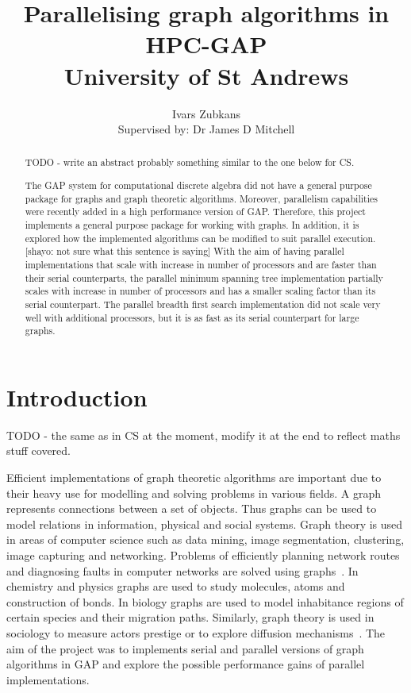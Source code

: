 \documentclass{report}
\title{Parallelising graph algorithms in HPC-GAP \\ \vspace{2 mm} {\large University of St Andrews}}
\author{Ivars Zubkans \\ \small Supervised by: Dr James D Mitchell}
\theoremstyle{plain}
\theoremstyle{definition}
\theoremstyle{remark}
\numberwithin{definition}{chapter}
\numberwithin{example}{chapter}
\numberwithin{figure}{chapter}
\begin{document}
\maketitle

\begin{abstract}

TODO - write an abstract probably something similar to the one below for CS.

The GAP system for computational discrete algebra did not have a general purpose package for graphs and graph theoretic algorithms. Moreover, parallelism capabilities were recently added in a high performance version of GAP. Therefore, this project implements a general purpose package for working with graphs. In addition, it is explored how the implemented algorithms can be modified to suit parallel execution.[shayo: not sure what this sentence is saying] With the aim of having parallel implementations that scale with increase in number of processors and are faster than their serial counterparts, the parallel minimum spanning tree implementation partially scales with increase in number of processors and has a smaller scaling factor than its serial counterpart. The parallel breadth first search implementation did not scale very well with additional processors, but it is as fast as its serial counterpart for large graphs.
\end{abstract}

\tableofcontents

\chapter{Introduction}

TODO - the same as in CS at the moment, modify it at the end to reflect maths stuff covered.

Efficient implementations of graph theoretic algorithms are important due to their heavy use for modelling and solving problems in various fields. A graph represents connections between a set of objects. Thus graphs can be used to model relations in information, physical and social systems. Graph theory is used in areas of computer science such as data mining, image segmentation, clustering, image capturing and networking. Problems of efficiently planning network routes and diagnosing faults in computer networks are solved using graphs~\cite{6005872}. In chemistry and physics graphs are used to study molecules, atoms and construction of bonds. In biology graphs are used to model inhabitance regions of certain species and their migration paths. Similarly, graph theory is used in sociology to measure actors prestige or to explore diffusion mechanisms~\cite{shirinivas2010applications}. The aim of the project was to implements serial and parallel versions of graph algorithms in GAP and explore the possible performance gains of parallel implementations.
\end{document}

